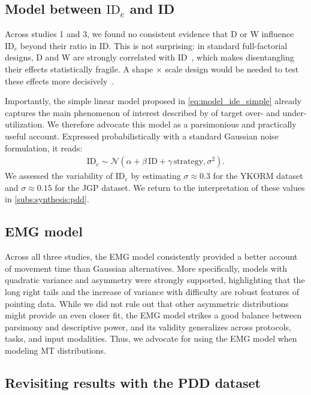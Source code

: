 \documentclass[acmlarge, manuscript,review]{acmart}
\newcommand{\ide}{\ensuremath{{\text{ID}_e}}\xspace}
\begin{document}
\subsection{Model between \ide and ID}
Across studies 1 and 3, we found no consistent evidence that D or W influence \ide beyond their ratio in ID. This is not surprising: in standard full-factorial designs, D and W are strongly correlated with ID~\cite{gori2018chi}, which makes disentangling their effects statistically fragile. A shape $\times$ scale design would be needed to test these effects more decisively~\cite{guiard2009}.


Importantly, the simple linear model proposed in \autoref{eq:model_ide_simple} already captures the main phenomenon of interest described by \citeauthor{zhai2004nominal} of target over- and under-utilization. We therefore advocate this model as a parsimonious and practically useful account. Expressed probabilistically with a standard Gaussian noise formulation, it reads:
\begin{align}
	\ide  \sim \mathcal{N}\left( \alpha + \beta\,\text{ID} + \gamma\,\text{strategy}, \sigma^2 \right).\label{eq:probabilistic_ide}
\end{align}
We assessed the variability of \ide by estimating $\sigma \approx 0.3$ for the YKORM dataset and $\sigma \approx 0.15$ for the JGP dataset. We return to the interpretation of these values in \autoref{subs:synthesis:pdd}.



\subsection{EMG model}
Across all three studies, the EMG model consistently provided a better account of movement time than Gaussian alternatives. More specifically, models with quadratic variance and asymmetry were strongly supported, highlighting that the long right tails and the increase of variance with difficulty are robust features of pointing data. While we did not rule out that other asymmetric distributions might provide an even closer fit, the EMG model strikes a good balance between parsimony and descriptive power, and its validity generalizes across protocols, tasks, and input modalities. Thus, we advocate for using the EMG model when modeling MT distributions. 


\subsection{Revisiting results with the PDD dataset\label{subs:synthesis:pdd}}
\end{document}
